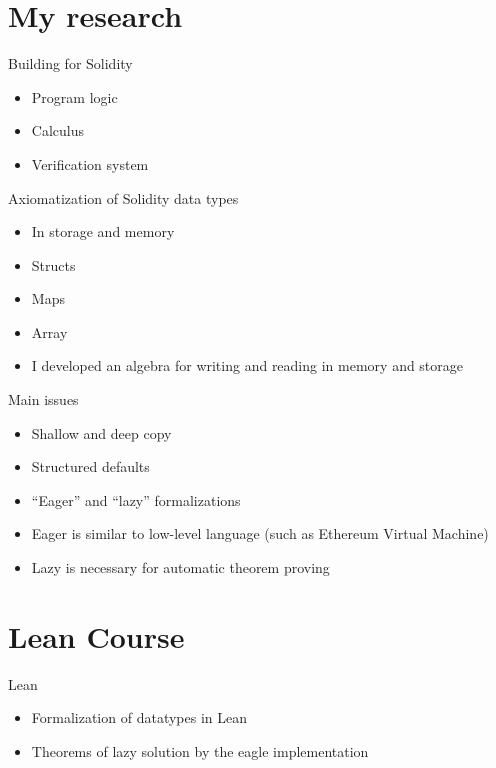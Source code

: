 \documentclass[bigger]{beamer}
\begin{document}
\section{My research}
\label{sec:org280f55d}
\begin{frame}[label={sec:org552f105}]{Building for Solidity}
\begin{itemize}
\item Program logic
\item Calculus
\item Verification system
\end{itemize}
\end{frame}
\begin{frame}[label={sec:org1aabe63}]{Axiomatization of Solidity data types}
\begin{itemize}
\item In storage and memory
\item Structs
\item Maps
\item Array
\item I developed an algebra for writing and reading in memory and storage
\end{itemize}
\end{frame}
\begin{frame}[label={sec:org6654620}]{Main issues}
\begin{itemize}
\item Shallow and deep copy
\item Structured defaults
\item ``Eager'' and ``lazy'' formalizations
\item Eager is similar to low-level language (such as Ethereum Virtual Machine)
\item Lazy is necessary for automatic theorem proving
\end{itemize}
\end{frame}
\section{Lean Course}
\label{sec:orge299a44}
\begin{frame}[label={sec:org06be413}]{Lean}
\begin{itemize}
\item Formalization of datatypes in Lean
\item Theorems of lazy solution by the eagle implementation
\end{itemize}
\end{frame}
\end{document}
